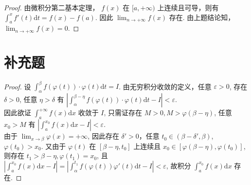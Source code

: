 \documentclass{article}
\newcommand{\dd}{\mathrm{d}}
\newcommand{\dx}{\dd x}
\newcommand{\dt}{\dd t}
\begin{document}
\begin{proof}
    由微积分第二基本定理， $f(x)$ 在 $[a, +\infty)$ 上连续且可导，则有 $\int_{a}^{x}f'(t)\dt = f(x) - f(a)$. 因此 $\lim_{n \to +\infty}f(x)$ 存在. 由上题结论知， $\lim_{n \to +\infty}f(x) = 0$.
\end{proof}

\section*{补充题}

\begin{proof}
    设 $\int_{\alpha}^{\beta}f(\varphi(t))\cdot \varphi(t)\dt = I$. 由无穷积分收敛的定义，任意 $\varepsilon > 0$, 存在 $\delta > 0$, 任意 $\eta > \delta$ 有 $\left\lvert \int_{\alpha}^{\beta - \eta}f(\varphi(t))\cdot \varphi(t)\dt - I\right\rvert < \varepsilon$. \\
    因此欲证 $\int_{a}^{+\infty}f(x)\dx$ 收敛于 $I$, 只需证存在 $M > 0, M > \varphi(\beta - \eta)$, 任意 $x_0 > M$ 有 $\left\lvert \int_{a}^{x_0}f(x)\dx - I\right\rvert < \varepsilon$. \\
    由于 $\lim_{x \to \beta}\varphi(x) = +\infty$, 因此存在 $\delta' > 0$，任意 $t_0 \in (\beta - \delta', \beta)$, $\varphi(t_0) > x_0$. 又由于 $\varphi(t)$ 在 $[\beta - \eta, t_0]$ 上连续且 $x_0 \in [\varphi(\beta - \eta), \varphi(t_0)]$, 则存在 $t_1 > \beta - \eta, \varphi(t_1) = x_0$, 且 $\left\lvert \int_{a}^{x_0}f(x)\dx - I\right\rvert = \left\lvert \int_{\alpha}^{t_1}f(\varphi(t))\varphi'(t)\dt - I\right\rvert < \varepsilon$, 故积分 $\int_{a}^{x_0}f(x)\dx$ 存在.
\end{proof}
\end{document}
